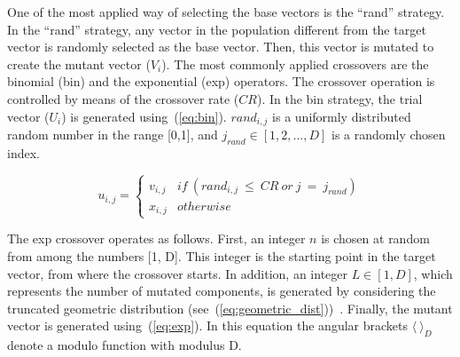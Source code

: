 \documentclass[preprint,3p]{elsarticle}
\newcommand{\EAS}{{\sc ea}s}
\newcommand{\DE}{{\sc de}}
\newcommand{\NP}{{\sc np}}
\begin{document}
One of the most applied way of selecting the base vectors is the ``rand'' strategy.
%
In the ``rand'' strategy, any vector in the population different from the target vector is randomly selected as the base vector.
%
Then, this vector is mutated to create the mutant vector ($V_i$).
%
%
%
%
%
%
%
%
The most commonly applied crossovers are the binomial (bin) and the exponential (exp) operators.
%
The crossover operation is controlled by means of the crossover rate ($CR$).
%
In the bin strategy, the trial vector ($U_i$) is generated using~(\ref{eq:bin}).
%
$rand_{i,j}$ is a uniformly distributed random number in the range [0,1], and
$j_{rand} \in [1, 2, ..., D]$ is a randomly chosen index.
%
%
%

\begin{equation}
	\label{eq:bin}
 u_{i,j} = \left \{
 \begin{array}{ll}
 		v_{i,j} & if\ (rand_{i,j}\ \leq\ CR\ or\ j\ =\ j_{rand}) \\
		x_{i,j} & otherwise
 \end{array} \right.
\end{equation}

The exp crossover operates as follows.
%
First, an integer $n$ is chosen at random from among the numbers [1, D].
%
This integer is the starting point in the target vector, from where the crossover starts.
%
In addition, an integer $L \in [1, D]$, which represents the number of mutated components, is
generated by considering the truncated geometric distribution (see~(\ref{eq:geometric_dist}))~\cite{Zaharie:09}.
%
Finally, the mutant vector is generated using~(\ref{eq:exp}).
%
In this equation the angular brackets $\langle\ \rangle _D$ denote a modulo function with modulus D.
\end{document}
